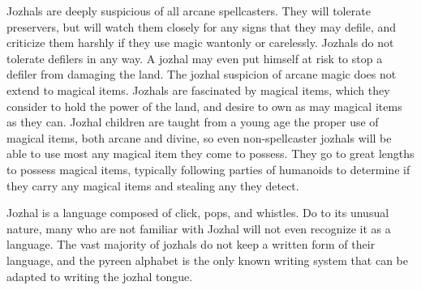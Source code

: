 Jozhals are deeply suspicious of all arcane spellcasters. They will tolerate preservers, but will watch them closely for any signs that they may defile, and criticize them harshly if they use magic wantonly or carelessly. Jozhals do not tolerate defilers in any way. A jozhal may even put himself at risk to stop a defiler from damaging the land. The jozhal suspicion of arcane magic does not extend to magical items. Jozhals are fascinated by magical items, which they consider to hold the power of the land, and desire to own as may magical items as they can. Jozhal children are taught from a young age the proper use of magical items, both arcane and divine, so even non-spellcaster jozhals will be able to use most any magical item they come to possess. They go to great lengths to possess magical items, typically following parties of humanoids to determine if they carry any magical items and stealing any they detect.

Jozhal is a language composed of click, pops, and whistles. Do to its unusual nature, many who are not familiar with Jozhal will not even recognize it as a language. The vast majority of jozhals do not keep a written form of their language, and the pyreen alphabet is the only known writing system that can be adapted to writing the jozhal tongue.


